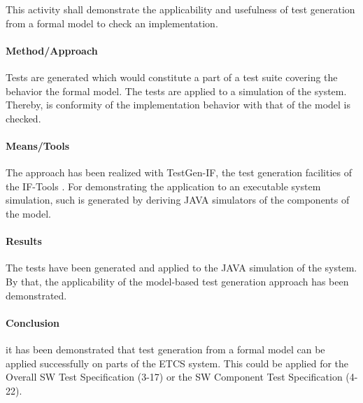 This activity shall demonstrate the applicability and usefulness of
test generation from a formal model to check an implementation.   


\paragraph{Method/Approach}

Tests are generated which would constitute a part of a test suite
covering the behavior the formal model. The tests are applied to a
simulation of the system. Thereby, is  conformity of
the implementation behavior with that of the model is checked. 

\paragraph{Means/Tools}

The approach has been realized with TestGen-IF, the test generation facilities of
the IF-Tools \cite{IFTools14}. For demonstrating the application to an
executable system simulation, such is generated by deriving JAVA
simulators of the components of the model.  

\paragraph{Results}

The tests have been generated and applied to the JAVA simulation of
the system. By that, the applicability of the model-based test
generation approach has been demonstrated.


\paragraph{Conclusion}

it has been demonstrated that test generation from a formal model can
be applied successfully on parts of the ETCS system. This could be
applied for the Overall SW Test Specification (3-17) or the SW
Component Test Specification (4-22). 